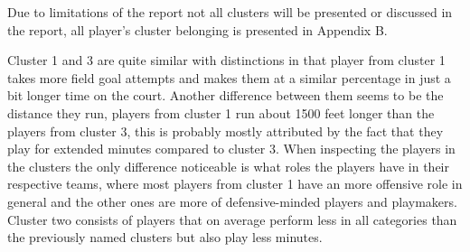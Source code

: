 \documentclass{article}
\begin{document}
\begin{table}[h]
\centering
{}
\caption{Cluster lables and typical players} 
\end{table}

Due to limitations of the report not all clusters will be presented or discussed in the report, all player's cluster belonging is presented in Appendix B.  

Cluster 1 and 3 are quite similar with distinctions in that player from cluster 1 takes more field goal attempts and makes them at a similar percentage in just a bit longer time on the court. Another difference between them seems to be the distance they run, players from cluster 1 run about 1500 feet longer than the players from cluster 3, this is probably mostly attributed by the fact that they play for extended minutes compared to cluster 3. When inspecting the players in the clusters the only difference noticeable is what roles the players have in their respective teams, where most players from cluster 1 have an more offensive role in general and the other ones are more of defensive-minded players and playmakers. Cluster two consists of players that on average perform less in all categories than the previously named clusters but also play less minutes.
\end{document}
